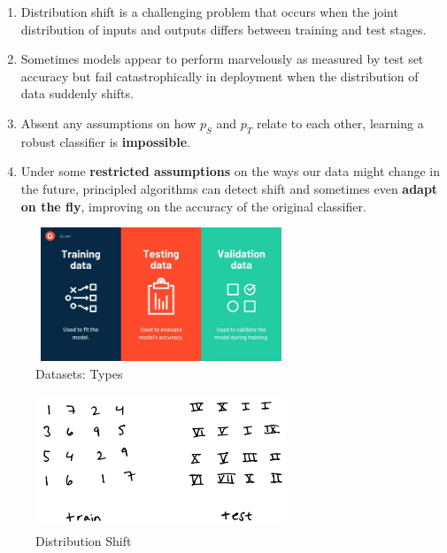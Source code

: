 \begin{enumerate}
    \item Distribution shift is a challenging problem that occurs when the joint distribution of inputs and outputs differs between training and test stages.

    \item Sometimes models appear to perform marvelously as measured by test set accuracy but fail catastrophically in deployment when the distribution of data suddenly shifts.

    \item Absent any assumptions on how $p_S$ and $p_T$ relate to each other, learning a robust classifier is \textbf{impossible}.

    \item Under some \textbf{restricted assumptions} on the ways our data might change in the future, principled algorithms can detect shift and sometimes even \textbf{adapt on the fly}, improving on the accuracy of the original classifier.
\end{enumerate}


\begin{table}[H]
    \begin{minipage}{0.45\textwidth}
        \begin{figure}[H]
            \centering
            \includegraphics[width=7.5cm,height=4cm]{Pictures/ml-data/ml-datasets-type.jpg}
            \caption{Datasets: Types}
        \end{figure}
    \end{minipage}
    \hfill
    \begin{minipage}{0.45\textwidth}
        \begin{figure}[H]
            \centering
            \includegraphics[width=7.5cm,height=4cm]{Pictures/ml-data/ml-data-distribution-shift.jpg}
            \caption{Distribution Shift}
        \end{figure}
    \end{minipage}
\end{table}




